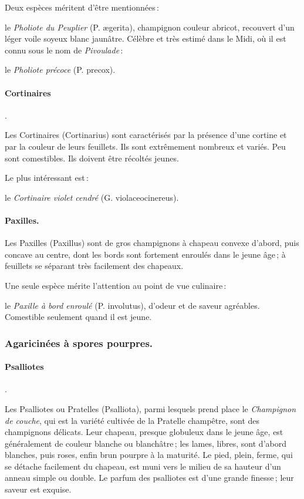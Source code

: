 Deux espèces méritent d'être mentionnées :

le \textit{Pholiote du Peuplier} (P. ægerita), champignon couleur abricot,
recouvert d'un léger voile soyeux blanc jaunâtre. Célèbre et très estimé dans
le Midi, où il est connu sous le nom de \textit{Pivoulade} :

le \textit{Pholiote précoce} (P. precox).

\paragraph{Cortinaires}.

Les Cortinaires (Cortinarius) sont caractérisés par la présence d'une cortine et
par la couleur de leurs feuillets. Ils sont extrêmement nombreux et variés. Peu
sont comestibles. Ils doivent être récoltés jeunes.

Le plus intéressant est :

le \textit{Cortinaire violet cendré} (G. violaceocinereus).

\paragraph{Paxilles.}

Les Paxilles (Paxillus) sont de gros champignons à chapeau convexe d'abord,
puis concave au centre, dont les bords sont fortement enroulés dans le jeune
âge ; à feuillets se séparant très facilement des chapeaux.

Une seule espèce mérite l'attention au point de vue culinaire :

le \textit{Paxille à bord enroulé} (P. involutus), d'odeur et de saveur
agréables. Comestible seulement quand il est jeune.

\subsubsection*{\centering \small\sc Agaricinées à spores pourpres.}

\paragraph{Psalliotes}.

Les Psalliotes ou Pratelles (Psalliota), parmi lesquels prend place le
\textit{Champignon de couche}, qui est la variété cultivée de la Pratelle
champêtre, sont des champignons délicats. Leur chapeau, presque globuleux dans
le jeune âge, est généralement de couleur blanche ou blanchâtre ; les lames,
libres, sont d'abord blanches, puis roses, enfin brun pourpre à la maturité. Le
pied, plein, ferme, qui se détache facilement du chapeau, est muni vers le
milieu de sa hauteur d'un anneau simple ou double. Le parfum des psalliotes est
d'une grande finesse ; leur saveur est exquise.

